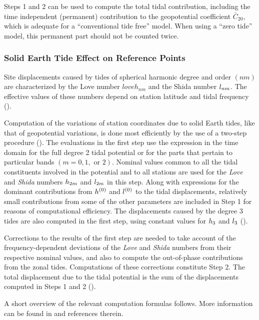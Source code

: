 Steps 1 and 2 can be used to compute the total tidal contribution, including 
the time independent (permanent) contribution to the geopotential coefficient 
$\bar{C}_{20}$, which is adequate for a ``conventional tide free'' model. 
When using a ``zero tide'' model, this permanent part should not be counted 
twice.

\subsubsection{Solid Earth Tide Effect on Reference Points}
\label{sssec:solid-earth-tide-reference-points}

Site displacements caused by tides of spherical harmonic degree and order $(nm)$ 
are characterized by the Love number $loveh _{nm}$ and the Shida number $l _{nm}$. 
The effective values of these numbers depend on station latitude and tidal 
frequency (\cite{WahrEtAl1981}).

Computation of the variations of station coordinates due to solid Earth tides, 
like that of geopotential variations, is done most efficiently by the use of a 
two-step procedure (\cite{iers2010}). The evaluations in the first step use 
the expression in the time domain for the full degree 2 tidal potential or for 
the parts that pertain to particular bands $(m = 0, 1, \text{ or } 2)$. Nominal 
values common to all the tidal constituents involved in the potential and to 
all stations are used for the \emph{Love} and \emph{Shida} numbers $h _{2m}$ 
and $l _{2m}$ in this step. Along with expressions for the dominant 
contributions from $h ^{(0)}$ and $l ^{(0)}$ to the tidal displacements,
relatively small contributions from some of the other parameters are included 
in Step 1 for reasons of computational efficiency. The displacements caused by 
the degree 3 tides are also computed in the first step, using constant values 
for $h _3$ and $l _3$ (\cite{iers2010}).

Corrections to the results of the first step are needed to take account of the 
frequency-dependent deviations of the \emph{Love} and \emph{Shida} numbers from 
their respective nominal values, and also to compute the out-of-phase 
contributions from the zonal tides. Computations of these corrections constitute 
Step 2. The total displacement due to the tidal potential is the sum of the 
displacements computed in Steps 1 and 2 (\cite{IERS2010}).

A short overview of the relevant computation formulas follows. More information 
can be found in \cite{iers2010} and references therein.

